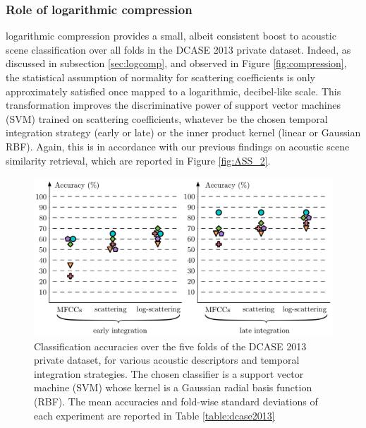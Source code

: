 \documentclass[journal]{IEEEtran}
\begin{document}
\subsubsection*{Role of logarithmic compression}
logarithmic compression provides a small, albeit consistent boost to acoustic scene classification over all folds in the DCASE 2013 private dataset.
Indeed, as discussed in subsection \ref{sec:logcomp}, and observed in Figure \ref{fig:compression}, the statistical assumption of normality for scattering coefficients is only approximately satisfied once mapped to a logarithmic, decibel-like scale.
This transformation improves the discriminative power of support vector machines (SVM) trained on scattering coefficients, whatever be the chosen temporal integration strategy (early or late) or the inner product kernel (linear or Gaussian RBF).
Again, this is in accordance with our previous findings on acoustic scene similarity retrieval, which are reported in Figure \ref{fig:ASS_2}.

\begin{figure}
\begin{center}
\includegraphics[width=\columnwidth]{folds.png}
\caption{Classification accuracies over the five folds of the DCASE 2013 private dataset, for various acoustic descriptors and temporal integration strategies. 
The chosen classifier is a support vector machine (SVM) whose kernel is a Gaussian radial basis function (RBF).
The mean accuracies and fold-wise standard deviations of each experiment are reported in Table \ref{table:dcase2013}}
\end{center}
\label{fig:folds}
\end{figure}
\end{document}
